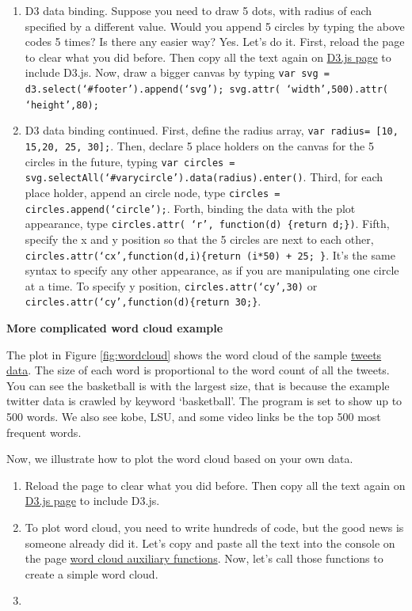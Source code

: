 \documentclass[a4paper, 11pt]{article}
\begin{document}
\begin{enumerate}
\item D3 data binding. Suppose you need to draw 5 dots, with radius of each specified by a different value. Would you append 5 circles by typing the above codes 5 times? Is there any easier way? Yes. Let's do it. First, reload the page to clear what you did before. Then copy all the text again on \href{https://raw.githubusercontent.com/mbostock/d3/master/d3.min.js}{D3.js page} to include D3.js. Now, draw a bigger canvas by typing \texttt{var svg = d3.select(`\#{footer}').append(`svg'); svg.attr( `width',500).attr( `height',80);} 
\item D3 data binding continued. First, define the radius array, \texttt{var radius= [10, 15,20, 25, 30];}. Then, declare 5 place holders on the canvas for the 5 circles in the future, typing \texttt{var circles = svg.selectAll(`\#{varycircle}').data(radius).enter()}. Third, for each place holder, append an circle node, type \texttt{circles = circles.append(`circle');}. Forth, binding the data with the plot appearance, type \texttt{circles.attr( `r', function(d) \{return d;\})}. Fifth, specify the x and y position so that the 5 circles are next to each other, \texttt{circles.attr(`cx',function(d,i)\{return (i*50) + 25; \}}. It's the same syntax to specify any other appearance, as if you are manipulating one circle at a time. To specify y position, \texttt{circles.attr(`cy',30)} or \texttt{circles.attr(`cy',function(d)\{return 30;\}}. 



\end{enumerate}
\textbf{More complicated word cloud example}

The plot in Figure \ref{fig:wordcloud} shows the word cloud of the sample \href{http://nymph332088.github.io/CIS4340/labassignments/Lab2/twitter_data.txt}{tweets data}. The size of each word is proportional to the word count of all the tweets. You can see the basketball is with the largest size, that is because the example twitter data is crawled by keyword `basketball'. The program is set to show up to 500 words. We also see kobe, LSU, and some video links be the top 500 most frequent words. 

Now, we illustrate how to plot the word cloud based on your own data.
\begin{enumerate}
\item Reload the page to clear what you did before. Then copy all the text again on \href{https://raw.githubusercontent.com/mbostock/d3/master/d3.min.js}{D3.js page} to include D3.js.
\item To plot word cloud, you need to write hundreds of code, but the good news is someone already did it. Let's copy and paste all the text into the console on the page \href{https://gist.githubusercontent.com/emeeks/3361332/raw/61cf57523fe8cf314333e5f60cc266351fec2017/d3.layout.cloud.js}{word cloud auxiliary functions}. Now, let's call those functions to create a simple word cloud. 
\item 

\end{enumerate}
\end{document}
